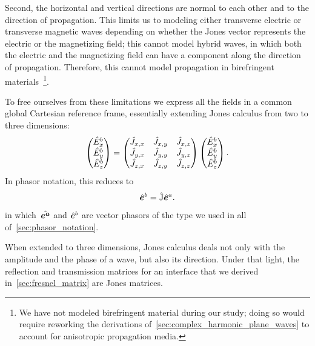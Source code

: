 Second, the horizontal and vertical directions are normal to each other and to the direction of propagation.
This limits us to modeling either transverse electric or transverse magnetic waves depending on whether the Jones vector represents the electric or the magnetizing field;
this cannot model hybrid waves, in which both the electric and the magnetizing field can have a component along the direction of propagation.
Therefore, this cannot model propagation in birefringent materials~\footnote{We have not modeled birefringent material during our study; doing so would require reworking the derivations of~\cref{sec:complex_harmonic_plane_waves} to account for anisotropic propagation media.}.

To free ourselves from these limitations we express all the fields in a common global Cartesian reference frame, essentially extending Jones calculus from two to three dimensions:
\begin{equation}
    \begin{pmatrix}
        \hat{E}^b_x\\
        \hat{E}^b_y\\
        \hat{E}^b_z
    \end{pmatrix}
    =
    \begin{pmatrix}
        \hat{J}_{x, x}   &   \hat{J}_{x, y}   &   \hat{J}_{x, z} \\
        \hat{J}_{y, x}   &   \hat{J}_{y, y}   &   \hat{J}_{y, z} \\
        \hat{J}_{z, x}   &   \hat{J}_{z, y}   &   \hat{J}_{z, z}
    \end{pmatrix}
    \begin{pmatrix}
        \hat{E}^b_x\\
        \hat{E}^b_y\\
        \hat{E}^b_z
    \end{pmatrix}
    \text{.}
    \label{eq:jones_matrix_3d}
\end{equation}
In phasor notation, this reduces to
\begin{equation}
    \hat{\bm{e}}^b = \hat{\mathrm{J}} \hat{\bm{e}}^a
    \text{.}
\end{equation}
in which~$\hat{\bm{e^a}}$ and $\hat{\bm{e}}^b$ are vector phasors of the type we used in all of~\cref{sec:phasor_notation}.

When extended to three dimensions, Jones calculus deals not only with the amplitude and the phase of a wave, but also its direction.
Under that light, the reflection and transmission matrices for an interface that we derived in~\vref{sec:fresnel_matrix} are Jones matrices.



